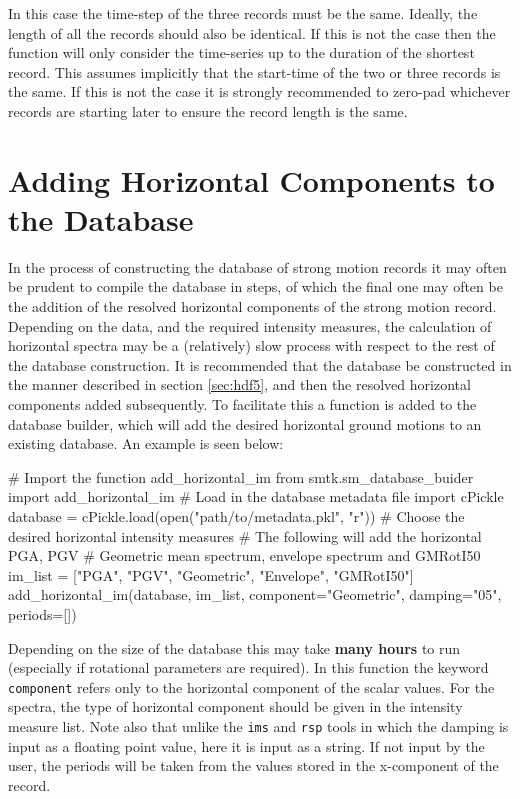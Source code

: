 In this case the time-step of the three records must be the same. Ideally, the length of all the records should also be identical. If this is not the case then the function will only consider the time-series up to the duration of the shortest record. This assumes implicitly that the start-time of the two or three records is the same. If this is not the case it is strongly recommended to zero-pad whichever records are starting later to ensure the record length is the same. 



\section{Adding Horizontal Components to the Database}

In the process of constructing the database of strong motion records it may often be prudent to compile the database in steps, of which the final one may often be the addition of the resolved horizontal components of the strong motion record. Depending on the data, and the required intensity measures, the calculation of horizontal spectra may be a (relatively) slow process with respect to the rest of the database construction. It is recommended that the database be constructed in the manner described in section \ref{sec:hdf5}, and then the resolved horizontal components added subsequently. To facilitate this a function is added to the database builder, which will add the desired horizontal ground motions to an existing database. An example is seen below:

\begin{python}[frame=single]
# Import the function add_horizontal_im
from smtk.sm_database_buider import add_horizontal_im
# Load in the database metadata file
import cPickle
database = cPickle.load(open("path/to/metadata.pkl", "r"))
# Choose the desired horizontal intensity measures
# The following will add the horizontal PGA, PGV
# Geometric mean spectrum, envelope spectrum and GMRotI50
im_list = ["PGA", "PGV", "Geometric", "Envelope", "GMRotI50"]
add_horizontal_im(database,
                  im_list, 
                  component="Geometric",
                  damping="05",
                  periods=[])
\end{python}

Depending on the size of the database this may take \textbf{many hours} to run (especially if rotational parameters are required). In this function the keyword \verb=component= refers only to the horizontal component of the scalar values. For the spectra, the type of horizontal component should be given in the intensity measure list. Note also that unlike the \verb=ims= and \verb=rsp= tools in which the damping is input as a floating point value, here it is input as a string. If not input by the user, the periods will be taken from the values stored in the x-component of the record. 

